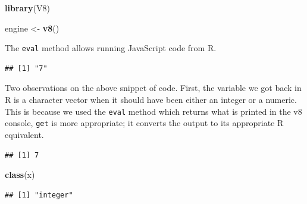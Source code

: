 \documentclass[
]{krantz}
\makeatletter
\newenvironment{Shaded}{\begin{snugshade}}{\end{snugshade}}
\newcommand{\CommentTok}[1]{\textcolor[rgb]{0.37,0.37,0.37}{\textit{#1}}}
\newcommand{\KeywordTok}[1]{\textcolor[rgb]{0.27,0.27,0.27}{\textbf{#1}}}
\newcommand{\NormalTok}[1]{#1}
\newcommand{\OperatorTok}[1]{\textcolor[rgb]{0.43,0.43,0.43}{\textbf{#1}}}
\newcommand{\StringTok}[1]{\textcolor[rgb]{0.5,0.5,0.5}{#1}}
\newenvironment{kframe}{%
\medskip{}
\setlength{\fboxsep}{.8em}
 \def\at@end@of@kframe{}%
 \ifinner\ifhmode%
  \def\at@end@of@kframe{\end{minipage}}%
  \begin{minipage}{\columnwidth}%
 \fi\fi%
 \def\FrameCommand##1{\hskip\@totalleftmargin \hskip-\fboxsep
 \colorbox{shadecolor}{##1}\hskip-\fboxsep
     \hskip-\linewidth \hskip-\@totalleftmargin \hskip\columnwidth}%
 \MakeFramed {\advance\hsize-\width
   \@totalleftmargin\z@ \linewidth\hsize
   \@setminipage}}%
 {\par\unskip\endMakeFramed%
 \at@end@of@kframe}
\renewenvironment{Shaded}{\begin{kframe}}{\end{kframe}}
\makeatother
\begin{document}
\begin{Shaded}
\begin{Highlighting}[]
\KeywordTok{library}\NormalTok{(V8)}

\NormalTok{engine \textless{}{-}}\StringTok{ }\KeywordTok{v8}\NormalTok{()}
\end{Highlighting}
\end{Shaded}

The \texttt{eval} method allows running JavaScript code from R.

\begin{Shaded}
\end{Shaded}

\begin{verbatim}
## [1] "7"
\end{verbatim}

Two observations on the above snippet of code. First, the variable we got back in R is a character vector when it should have been either an integer or a numeric. This is because we used the \texttt{eval} method which returns what is printed in the v8 console, \texttt{get} is more appropriate; it converts the output to its appropriate R equivalent.

\begin{Shaded}
\end{Shaded}

\begin{verbatim}
## [1] 7
\end{verbatim}

\begin{Shaded}
\begin{Highlighting}[]
\KeywordTok{class}\NormalTok{(x)}
\end{Highlighting}
\end{Shaded}

\begin{verbatim}
## [1] "integer"
\end{verbatim}
\end{document}

